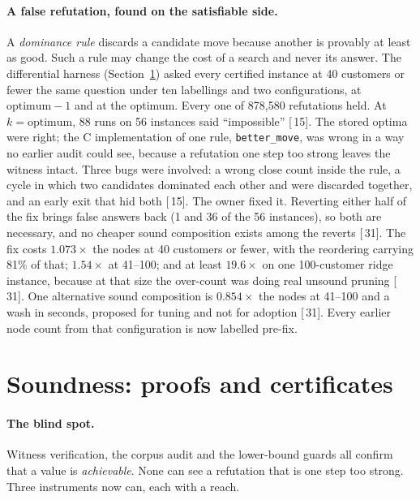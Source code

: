 \documentclass[11pt,a4paper]{article}
\renewcommand{\S}[1]{[\textsection\,#1]}
\newcommand{\code}[1]{\texttt{#1}}
\begin{document}
\paragraph{A false refutation, found on the satisfiable side.}
A \emph{dominance rule} discards a candidate move because another is provably
at least as good. Such a rule may change the cost of a search and never its
answer. The differential harness (Section~\ref{sec:soundness}) asked every
certified instance at 40 customers or fewer the same question under ten
labellings and two configurations, at $\text{optimum}-1$ and at the optimum.
Every one of 878,580 refutations held. At $k = \text{optimum}$, 88 runs on 56
instances said ``impossible'' \S{15}. The stored optima were right; the C
implementation of one rule, \code{better\_move}, was wrong in a way no earlier
audit could see, because a refutation one step too strong leaves the witness
intact. Three bugs were involved: a wrong close count inside the rule, a cycle
in which two candidates dominated each other and were discarded together, and
an early exit that hid both \S{15}. The owner fixed it. Reverting either half
of the fix brings false answers back (1 and 36 of the 56 instances), so both
are necessary, and no cheaper sound composition exists among the reverts
\S{31}. The fix costs $1.073\times$ the nodes at 40 customers or fewer, with
the reordering carrying 81\% of that; $1.54\times$ at 41--100; and at least
$19.6\times$ on one 100-customer ridge instance, because at that size the
over-count was doing real unsound pruning \S{31}. One alternative sound
composition is $0.854\times$ the nodes at 41--100 and a wash in seconds,
proposed for tuning and not for adoption \S{31}. Every earlier node count from
that configuration is now labelled pre-fix.

\section{Soundness: proofs and certificates}
\label{sec:soundness}

\paragraph{The blind spot.}
Witness verification, the corpus audit and the lower-bound guards all confirm
that a value is \emph{achievable}. None can see a refutation that is one step
too strong. Three instruments now can, each with a reach.
\end{document}
